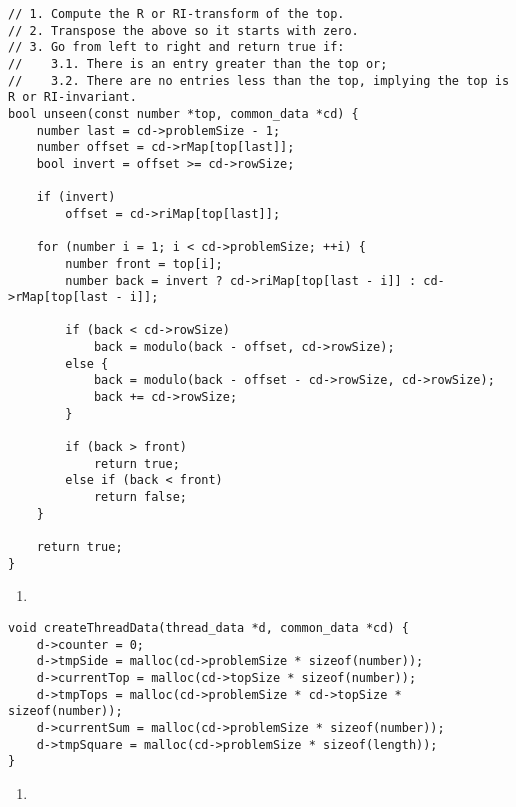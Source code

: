 \begin{lstlisting}[caption={},label={unseen}]
// 1. Compute the R or RI-transform of the top.
// 2. Transpose the above so it starts with zero.
// 3. Go from left to right and return true if:
//    3.1. There is an entry greater than the top or;
//    3.2. There are no entries less than the top, implying the top is R or RI-invariant.
bool unseen(const number *top, common_data *cd) {
    number last = cd->problemSize - 1;
    number offset = cd->rMap[top[last]];
    bool invert = offset >= cd->rowSize;

    if (invert)
        offset = cd->riMap[top[last]];

    for (number i = 1; i < cd->problemSize; ++i) {
        number front = top[i];
        number back = invert ? cd->riMap[top[last - i]] : cd->rMap[top[last - i]];

        if (back < cd->rowSize)
            back = modulo(back - offset, cd->rowSize);
        else {
            back = modulo(back - offset - cd->rowSize, cd->rowSize);
            back += cd->rowSize;
        }

        if (back > front)
            return true;
        else if (back < front)
            return false;
    }

    return true;
}
\end{lstlisting}

\begin{enumerate}
\addtocounter{enumi}{1}
\item 
\end{enumerate}

\begin{lstlisting}[caption={},label={createThreadData}]
void createThreadData(thread_data *d, common_data *cd) {
    d->counter = 0;
    d->tmpSide = malloc(cd->problemSize * sizeof(number));
    d->currentTop = malloc(cd->topSize * sizeof(number));
    d->tmpTops = malloc(cd->problemSize * cd->topSize * sizeof(number));
    d->currentSum = malloc(cd->problemSize * sizeof(number));
    d->tmpSquare = malloc(cd->problemSize * sizeof(length));
}
\end{lstlisting}

\begin{enumerate}
\addtocounter{enumi}{1}
\item 
\end{enumerate}

